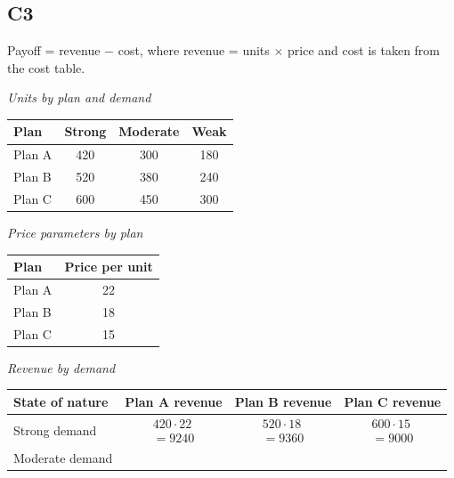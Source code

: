 \begin{ExamProblems}
		\subsection*{C3}
		Payoff = revenue $-$ cost, where revenue = units $\times$ price and cost is taken from the cost table.
		\begin{center}
			\textit{Units by plan and demand} \\
			\begin{tabular}{l c c c}
				\toprule
				Plan & Strong & Moderate & Weak \\
				\midrule
				Plan A & 420 & 300 & 180 \\
				Plan B & 520 & 380 & 240 \\
				Plan C & 600 & 450 & 300 \\
				\bottomrule
		\end{tabular}
		\end{center}
		\begin{center}
			\textit{Price parameters by plan}
			\begin{center}
				\begin{tabular}{l c}
					\toprule
					Plan & Price per unit \\
					\midrule
					Plan A & 22 \\
					Plan B & 18 \\
					Plan C & 15 \\
					\bottomrule
				\end{tabular}
			\end{center}
		\end{center}
		\begin{center}
			\textit{Revenue by demand} \\
			\begin{tabular}{l c c c}
				\toprule
				State of nature & Plan A revenue & Plan B revenue & Plan C revenue \\
				\midrule
				Strong demand &
				$\begin{array}{l}
					420\cdot 22\\
					= 9240
				\end{array}$ &
				$\begin{array}{l}
					520\cdot 18\\
					= 9360
				\end{array}$ &
				$\begin{array}{l}
					600\cdot 15\\
					= 9000
				\end{array}$ \\
				Moderate demand &

\end{tabular}
\end{center}
\end{ExamProblems}
